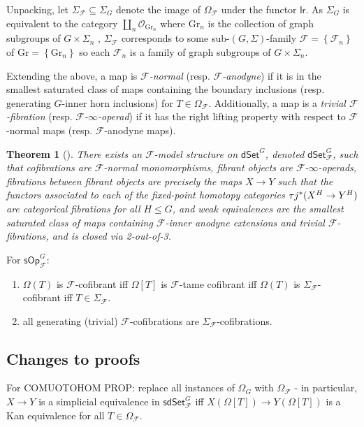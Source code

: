 \documentclass[a4paper,10pt
,draft
]{article}%
\numberwithin{equation}{section}
\numberwithin{figure}{section}
\newtheorem{theorem}[equation]{Theorem}%
\theoremstyle{definition} %
\newcommand{\set}[1]{\left\{#1\right\}}%
\newcommand{\sOp}{\ensuremath{\mathsf{sOp}}}%
\newcommand{\dSet}{\mathsf{dSet}}
\newcommand{\F}{\ensuremath{\mathcal F}}
\renewcommand{\O}{\ensuremath{\mathcal O}}
\newcommand{\1}{\ensuremath{\mathbbm 1}}%
\begin{document}
Unpacking, let $\Sigma_\F \subseteq \Sigma_G$ denote the image of $\Omega_\F$ under the functor $\mathsf{lr}$.
As $\Sigma_G$ is equivalent to the category $\coprod_n \O_{\mathrm{Gr}_n}$
where $\mathrm{Gr}_n$ is the collection of graph subgroups of $G \times \Sigma_n$ ,
$\Sigma_\F$ corresponds to some sub-$(G, \Sigma)$-family $\F = \set{\F_n}$ of $\mathrm{Gr} = \set{\mathrm{Gr}_n}$
so each $\F_n$ is a family of graph subgroups of $G \times \Sigma_n$.      

Extending the above, a map is \textit{$\F$-normal} (resp. \textit{$\F$-anodyne})
if it is in the smallest saturated class of maps containing the
boundary inclusions (resp. generating $G$-inner horn inclusions) for $T \in \Omega_\F$.
Additionally, a map is a \textit{trivial $\F$-fibration} (resp. \textit{$\F$-$\infty$-operad}) if it has the right lifting property with respect to $\F$-normal maps (resp. $\F$-anodyne maps).

\begin{theorem}[{\cite[\S 9]{Per18}}]
      There exists an $\F$-model structure on $\dSet^G$, denoted $\dSet^G_\F$, such that
      cofibrations are $\F$-normal monomorphisms,
      fibrant objects are $\F$-$\infty$-operads,
      fibrations between fibrant objects are precisely the maps $X \to Y$ such that the functors associated to each of the fixed-point homotopy categories $\tau j^{\**}(X^H \to Y^H)$ are categorical fibrations for all $H \leq G$,
      and weak equivalences are the smallest saturated class of maps containing $\F$-inner anodyne extensions and trivial $\F$-fibrations, and is closed via 2-out-of-3.
\end{theorem}


For $\sOp^G_\F$:
\begin{enumerate}
\item $\Omega(T)$ is $\F$-cofibrant iff $\Omega[T]$ is $\F$-tame cofibrant iff $\Omega(T)$ is $\Sigma_\F$-cofibrant iff $T \in \Sigma_\F$.
\item all generating (trivial) $\F$-cofibrations are $\Sigma_\F$-cofibrations.
\end{enumerate}


\subsection{Changes to proofs}



For COMUOTOHOM PROP: replace all instances of $\Omega_G$ with $\Omega_{\mathcal F}$ - in particular, $X \to Y$ is a simplicial equivalence in $\mathsf{sdSet}^G_{\mathcal F}$ iff $X(\Omega[T]) \to Y(\Omega[T])$ is a Kan equivalence for all $T \in \Omega_{\mathcal F}$. 
\end{document}
